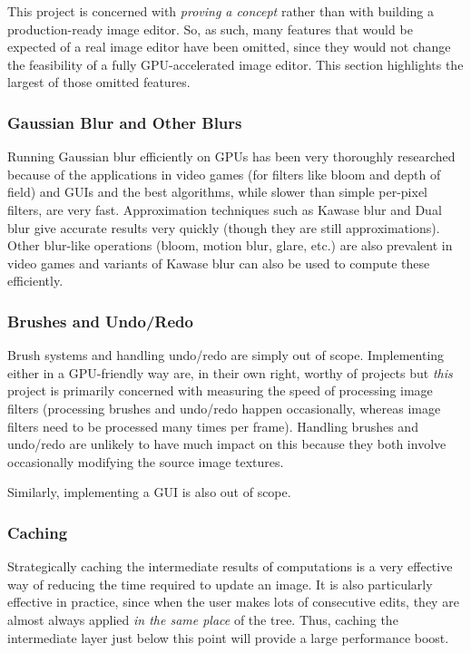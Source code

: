 \documentclass[12pt]{article}
\begin{document}
This project is concerned with \emph{proving a concept} rather than with building a production-ready
image editor.  So, as such, many features that would be expected of a real image editor have been
omitted, since they would not change the feasibility of a fully GPU-accelerated image editor.  This
section highlights the largest of those omitted features.

\subsubsection{Gaussian Blur and Other Blurs}

Running Gaussian blur efficiently on GPUs has been very thoroughly researched \cite{fast-blur}
because of the applications in video games (for filters like bloom and depth of field) and GUIs and
the best algorithms, while slower than simple per-pixel filters, are very fast.  Approximation
techniques such as Kawase blur and Dual blur \cite{kawase-blur} give accurate results very quickly
(though they are still approximations).  Other blur-like operations (bloom, motion blur, glare,
etc.) are also prevalent in video games and variants of Kawase blur can also be used to compute
these efficiently.  

\subsubsection{Brushes and Undo/Redo}

Brush systems and handling undo/redo are simply out of scope.  Implementing either in a GPU-friendly
way are, in their own right, worthy of projects but \emph{this} project is primarily concerned with
measuring the speed of processing image filters (processing brushes and undo/redo happen
occasionally, whereas image filters need to be processed many times per frame).  Handling brushes
and undo/redo are unlikely to have much impact on this because they both involve occasionally
modifying the source image textures.

Similarly, implementing a GUI is also out of scope.

\subsubsection{Caching}

Strategically caching the intermediate results of computations is a very effective way of reducing
the time required to update an image.  It is also particularly effective in practice, since when the
user makes lots of consecutive edits, they are almost always applied \emph{in the same place} of the
tree.  Thus, caching the intermediate layer just below this point will provide a large performance
boost.
\end{document}
